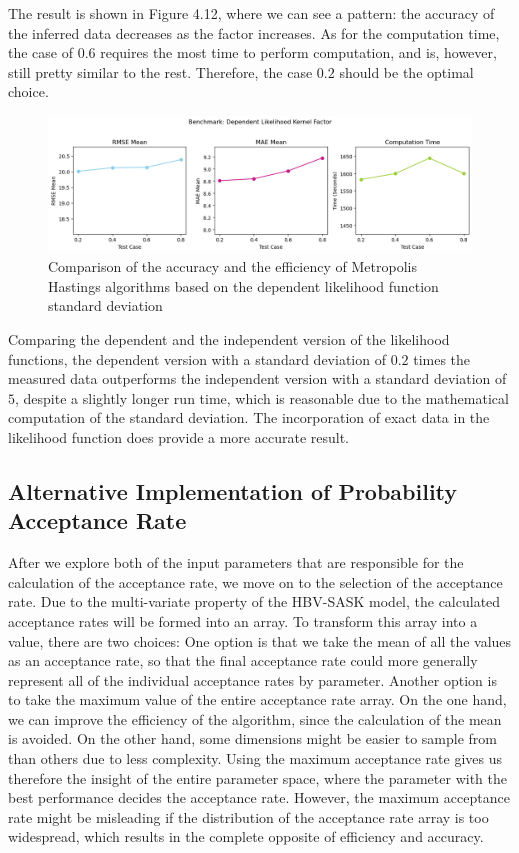The result is shown in Figure 4.12, where we can see a pattern: the accuracy of the inferred data decreases as the factor increases. As for the computation time, the case of $0.6$ requires the most time to perform computation, and is, however, still pretty similar to the rest. Therefore, the case $0.2$ should be the optimal choice.

\begin{figure}[H]
    \centering
    \includegraphics[width=1\textwidth]{figures/basic_mh/benchmark/sensitivity_likelihood_dependent.png}
    \captionsetup{width=.8\textwidth}
    \caption{Comparison of the accuracy and the efficiency of Metropolis Hastings algorithms based on the dependent likelihood function standard deviation}
    \label{fig:enter-label}
\end{figure}


Comparing the dependent and the independent version of the likelihood functions, the dependent version with a standard deviation of $0.2$ times the measured data outperforms the independent version with a standard deviation of $5$, despite a slightly longer run time, which is reasonable due to the mathematical computation of the standard deviation. The incorporation of exact data in the likelihood function does provide a more accurate result.

\subsection{Alternative Implementation of Probability Acceptance Rate}
After we explore both of the input parameters that are responsible for the calculation of the acceptance rate, we move on to the selection of the acceptance rate. Due to the multi-variate property of the HBV-SASK model, the calculated acceptance rates will be formed into an array. To transform this array into a value, there are two choices: One option is that we take the mean of all the values as an acceptance rate, so that the final acceptance rate could more generally represent all of the individual acceptance rates by parameter. Another option is to take the maximum value of the entire acceptance rate array. On the one hand, we can improve the efficiency of the algorithm, since the calculation of the mean is avoided. On the other hand, some dimensions might be easier to sample from than others due to less complexity. Using the maximum acceptance rate gives us therefore the insight of the entire parameter space, where the parameter with the best performance decides the acceptance rate. However, the maximum acceptance rate might be misleading if the distribution of the acceptance rate array is too widespread, which results in the complete opposite of efficiency and accuracy.

